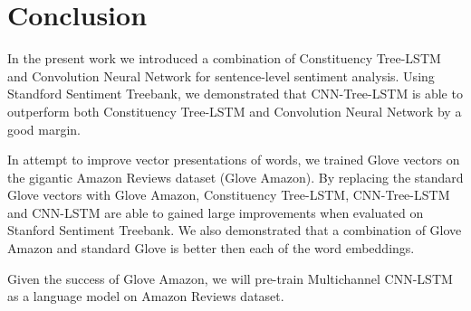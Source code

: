 \section{Conclusion}
In the present work we introduced a combination of Constituency Tree-LSTM and Convolution Neural Network for sentence-level sentiment analysis. 
Using Standford Sentiment Treebank, we demonstrated that CNN-Tree-LSTM is able to outperform both Constituency Tree-LSTM and Convolution Neural Network by a good margin.

In attempt to improve vector presentations of words, we trained Glove vectors on the gigantic Amazon Reviews dataset (Glove Amazon).
By replacing the standard Glove vectors with Glove Amazon, Constituency Tree-LSTM, CNN-Tree-LSTM and CNN-LSTM are able to gained large improvements when evaluated on Stanford Sentiment Treebank.
We also demonstrated that a combination of Glove Amazon and standard Glove is better then each of the word embeddings.

Given the success of Glove Amazon, we will pre-train Multichannel CNN-LSTM as a language model on Amazon Reviews dataset.

